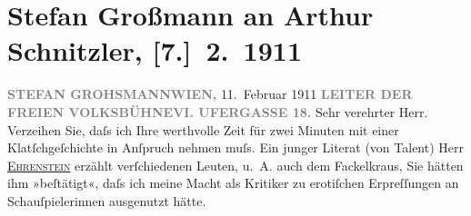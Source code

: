 

         
         \renewcommand{\erwaehntePersonen}{Personen: Albert Ehrenstein, Karl Kraus}
         \renewcommand{\erwaehnteInstitutionen}{Institutionen: Die Fackel, Wiener Freie Volksbühne}
         \renewcommand{\erwaehnteOrte}{Orte: Linke Wienzeile, Wien}
         \renewcommand{\erwaehnteWerke}{}
               \section[Stefan Großmann an Arthur Schnitzler, {[}7.{]} 2. 1911]{ Stefan Großmann an Arthur Schnitzler,
                    {[}7.{]} 2. 1911}\nopagebreak{}\rehead{ }\begin{ledgroupsized}[t]{13cm}\normalsize\beginnumbering \toendnotes[C]{\smallbreak\pagebreak[2]} 
\pstart
           {\pb}\textcolor{gray}{\textbf{STEFAN GROHSMANN}}\hfill \textcolor{gray}{\textbf{WIEN,}}{ }11. Februar 1911\pend
           \pstart
           \textcolor{gray}{\textbf{LEITER DER FREIEN
                                    VOLKSBÜHNE}}\hfill \textcolor{gray}{\textbf{VI. UFERGASSE 18.}}\pend
           \pstart\center{}Sehr verehrter Herr.\pend\pstart
           Verzeihen Sie, daſs ich Ihre werthvolle Zeit für zwei Minuten mit einer
                    Klatſchgeſchichte  in Anſpruch nehmen
                    muſs.\pend
           \pstart
           Ein junger Literat (von Talent) Herr \uline{\textsc{Ehrenstein}} erzählt verſchiedenen Leuten, u. A. auch dem Fackelkraus, Sie hätten ihm
                    »beſtätigt«, daſs ich meine Macht als Kritiker zu erotiſchen Erpreſſungen an
                    Schauſpielerinnen ausgenutzt hätte.\pend

\end{ledgroupsized}
